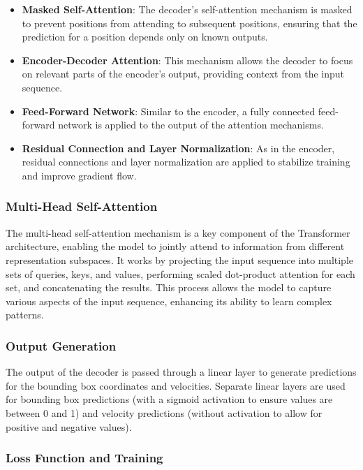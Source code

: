 \documentclass[12pt,oneside]{book} %
\begin{document}
\begin{itemize}
    \item \textbf{Masked Self-Attention}: The decoder's self-attention mechanism is masked to prevent positions from attending to subsequent positions, ensuring that the prediction for a position depends only on known outputs.
    \item \textbf{Encoder-Decoder Attention}: This mechanism allows the decoder to focus on relevant parts of the encoder's output, providing context from the input sequence.
    \item \textbf{Feed-Forward Network}: Similar to the encoder, a fully connected feed-forward network is applied to the output of the attention mechanisms.
    \item \textbf{Residual Connection and Layer Normalization}: As in the encoder, residual connections and layer normalization are applied to stabilize training and improve gradient flow.
\end{itemize}

\subsubsection{Multi-Head Self-Attention}

The multi-head self-attention mechanism is a key component of the Transformer
architecture, enabling the model to jointly attend to information from
different representation subspaces. It works by projecting the input sequence
into multiple sets of queries, keys, and values, performing scaled dot-product
attention for each set, and concatenating the results. This process allows the
model to capture various aspects of the input sequence, enhancing its ability
to learn complex patterns.

\subsubsection{Output Generation}

The output of the decoder is passed through a linear layer to generate
predictions for the bounding box coordinates and velocities. Separate linear
layers are used for bounding box predictions (with a sigmoid activation to
ensure values are between 0 and 1) and velocity predictions (without activation
to allow for positive and negative values).

\subsubsection{Loss Function and Training}
\end{document}
